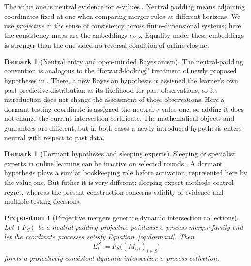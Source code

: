 \documentclass[11pt]{article}
\numberwithin{equation}{section}
\theoremstyle{plain}
\newtheorem{proposition}[theorem]{Proposition}
\theoremstyle{definition}
\newtheorem{remark}[theorem]{Remark}
\begin{document}
The value one is neutral evidence for $e$-values \citep{VovkWang2021}. Neutral padding means adjoining coordinates fixed at one when comparing merger rules at different horizons. We use \emph{projective} in the sense of consistency across finite-dimensional systems; here the consistency maps are the embeddings $\iota_{B,S}$. Equality under these embeddings is stronger than the one-sided no-reversal condition of online closure.

\begin{remark}[Neutral entry and open-minded Bayesianism]\label{rem:open-minded-neutrality}
The neutral-padding convention is analogous to the ``forward-looking'' treatment of newly proposed hypotheses in \citet{SterkenburgDeHeide2022}. There, a new Bayesian hypothesis is assigned the learner's own past predictive distribution as its likelihood for past observations, so its introduction does not change the assessment of those observations. Here a dormant testing coordinate is assigned the neutral $e$-value one, so adding it does not change the current intersection certificate. The mathematical objects and guarantees are different, but in both cases a newly introduced hypothesis enters neutral with respect to past data.
\end{remark}

\begin{remark}[Dormant hypotheses and sleeping experts]\label{rem:sleeping-experts}
Sleeping or specialist experts in online learning can be inactive on selected rounds \citep{FreundEtAl1997Specialists,KoolenVanErven2010}. A dormant hypothesis plays a similar bookkeeping role before activation, represented here by the value one. But futher it is very different: sleeping-expert methods control regret, whereas the present construction concerns validity of evidence and multiple-testing decisions.
\end{remark}

\begin{proposition}[Projective mergers generate dynamic intersection collections]\label{prop:projective-merger}
Let $(F_S)$ be a neutral-padding projective pointwise $e$-process merger family and let the coordinate processes satisfy Equation~\eqref{eq:dormant}. Then
\begin{equation}\label{eq:projective-merger-process}
  E_t^S:=F_S\bigl((M_{i,t})_{i\in S}\bigr)
\end{equation}
forms a projectively consistent dynamic intersection $e$-process collection.
\end{proposition}
\end{document}
